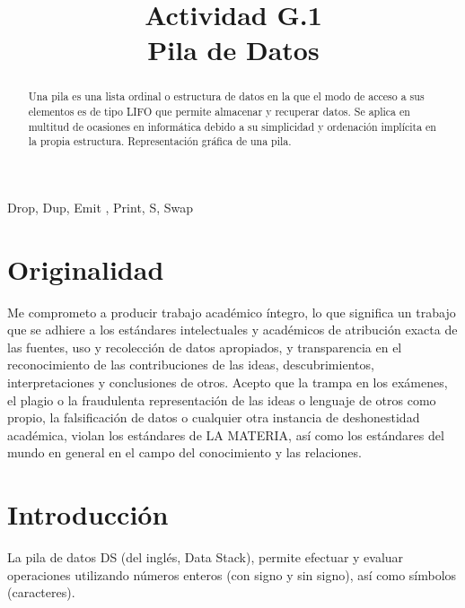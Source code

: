 \documentclass[conference]{IEEEtran}
\begin{document}
\title{Actividad G.1\\Pila de Datos
}

\author{
}
\onecolumn
\maketitle

\begin{abstract}
Una pila es una lista ordinal o estructura de datos en la que el modo de acceso a sus elementos es de tipo LIFO que permite almacenar y recuperar datos. Se aplica en multitud de ocasiones en informática debido a su simplicidad y ordenación implícita en la propia estructura. Representación gráfica de una pila.
\end{abstract}

\begin{IEEEkeywords}
\begin{center}
Drop, Dup, Emit , Print, S, Swap
\end{center}
\end{IEEEkeywords}

\section{Originalidad}

Me comprometo a producir trabajo académico íntegro, lo que significa un trabajo que se adhiere a los estándares intelectuales y académicos de atribución exacta de las fuentes, uso y recolección de datos apropiados, y transparencia en el reconocimiento de las contribuciones de las ideas, descubrimientos, interpretaciones y conclusiones de otros.
Acepto que la trampa en los exámenes, el plagio o la fraudulenta representación de las ideas o lenguaje de otros como propio, la falsificación de datos o cualquier otra instancia de deshonestidad académica, violan los estándares de LA MATERIA, así como los estándares del mundo en general en el campo del conocimiento y las relaciones.

\section{Introducción}
\begin{center}
La pila de datos DS (del inglés, Data Stack), permite efectuar y evaluar operaciones utilizando números enteros (con signo y sin signo), así como símbolos (caracteres).
\end{center}
\end{document}
